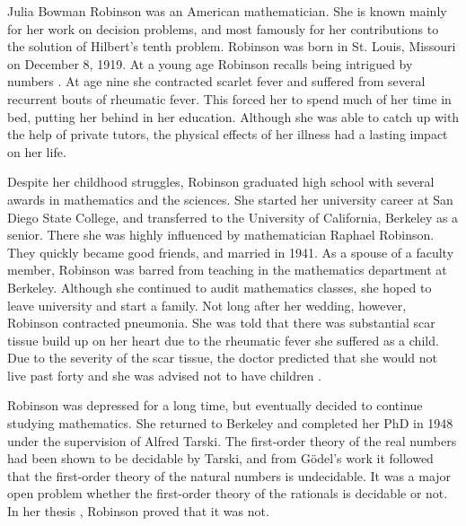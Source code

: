 \documentclass[../../../include/open-logic-section]{subfiles}
\begin{document}



Julia Bowman Robinson was an American mathematician. She is known
mainly for her work on decision problems, and most famously for her
contributions to the solution of Hilbert's tenth problem. Robinson was
born in St. Louis, Missouri on December 8, 1919. At a young age
Robinson recalls being intrigued by numbers \citep[4]{Reid1986}. At
age nine she contracted scarlet fever and suffered from several
recurrent bouts of rheumatic fever. This forced her to spend much of
her time in bed, putting her behind in her education.  Although she
was able to catch up with the help of private tutors, the physical
effects of her illness had a lasting impact on her life.

Despite her childhood struggles, Robinson graduated high school with
several awards in mathematics and the sciences. She started her university
career at San Diego State College, and transferred to the University of
California, Berkeley as a senior. There she was highly influenced by
mathematician Raphael Robinson. They quickly became good friends, and
married in 1941. As a spouse of a faculty member, Robinson was
barred from teaching in the mathematics department at Berkeley. Although
she continued to audit mathematics classes, she hoped to leave university
and start a family. Not long after her wedding, however, Robinson contracted
pneumonia. She was told that there was substantial scar tissue build up on
her heart due to the rheumatic fever she suffered as a child. Due to the
severity of the scar tissue, the doctor predicted that she would not live
past forty and she was advised not to have children \citep[13]{Reid1986}.

Robinson was depressed for a long time, but eventually decided to
continue studying mathematics. She returned to Berkeley and completed
her PhD in 1948 under the supervision of Alfred Tarski. The
first-order theory of the real numbers had been shown to be decidable
by Tarski, and from G\"odel's work it followed that the first-order
theory of the natural numbers is undecidable.  It was a major open
problem whether the first-order theory of the rationals is decidable
or not. In her thesis \citeyearpar{Robinson1949}, Robinson proved that
it was not. 
\end{document}
